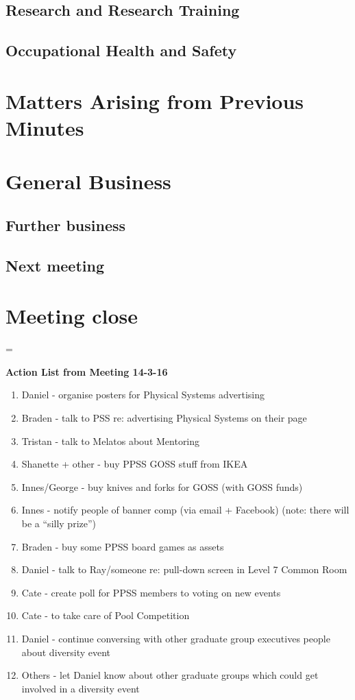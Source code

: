 \documentclass[a4paper,11pt]{article}
\newenvironment{absolutelynopagebreak}
  {\par\nobreak\vfil\penalty0\vfilneg
   \vtop\bgroup}
  {\par\xdef\tpd{\the\prevdepth}\egroup
   \prevdepth=\tpd}
\begin{document}
\begin{absolutelynopagebreak}
\subsection{Research and Research Training}
\subsection{Occupational Health and Safety}
\section{Matters Arising from Previous Minutes}
\section{General Business}
\subsection{Further business}
\subsection{Next meeting}	
\section{Meeting close}

\end{absolutelynopagebreak}

\pagebreak
{\Large \textbf{Action List from Meeting 14-3-16}}

\begin{enumerate}
\item Daniel - organise posters for Physical Systems advertising
\item Braden - talk to PSS re: advertising Physical Systems on their page
\item Tristan - talk to Melatos about Mentoring
\item Shanette + other - buy PPSS GOSS stuff from IKEA
\item Innes/George - buy knives and forks for GOSS (with GOSS funds)
\item Innes - notify people of banner comp (via email + Facebook) (note: there will be a ``silly prize'')
\item Braden - buy some PPSS board games as assets
\item Daniel - talk to Ray/someone re: pull-down screen in Level 7 Common Room
\item Cate - create poll for PPSS members to voting on new events
\item Cate - to take care of Pool Competition
\item Daniel - continue conversing with other graduate group executives people about diversity event
\item Others - let Daniel know about other graduate groups which could get involved in a diversity event
\end{enumerate}
\end{document}
